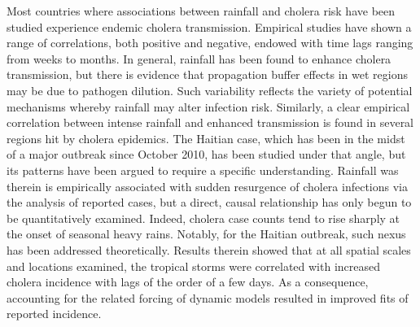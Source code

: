 Most countries where associations between rainfall and cholera risk have been studied experience endemic cholera transmission\cite{Rinaldo:ModelingKeyDrivers:2017}. Empirical studies have shown a range of correlations, both positive and negative, endowed with time lags ranging from weeks to months\cite{Ruiz-Moreno:CholeraSeasonalityMadras:2007,Emch:SeasonalityCholera1974:2008,Magny:CholeraOutbreakSenegal:2012}. In general, rainfall has been found to enhance cholera transmission, but there is evidence that propagation buffer effects in wet regions may be due to pathogen dilution\cite{Ruiz-Moreno:CholeraSeasonalityMadras:2007}. Such variability reflects the variety of potential mechanisms whereby rainfall may alter infection risk. Similarly, a clear empirical correlation between intense rainfall and enhanced transmission is found in several regions hit by cholera epidemics\cite{Magny:EnvironmentalSignaturesAssociated:2008,Rebaudet:EnvironmentalDeterminantsCholera:2013,Rebaudet:CholeraCoastalAfrica:2013,Jutla:WaterMarkerMonitored:2013,Gaudart:SpatioTemporalDynamicsCholera:2013}. The Haitian case, which has been in the midst of a major outbreak since October 2010\cite{Frerichs:NepaleseOriginCholera:2012,Gaudart:SpatioTemporalDynamicsCholera:2013,Kirpich:CholeraTransmissionOuest:2015,ERCCECHO:HaitiHurricaneMatthew:2016,Camacho:PredictionCholeraDynamics:2016,Pasetto:RealtimeProjectionsCholera:2017,Khan:AssessmentRiskCholera:2017}, has been studied under that angle, but its patterns have been argued to require a specific understanding\cite{Piarroux:UnderstandingCholeraEpidemic:2011}. Rainfall was therein is empirically associated with sudden resurgence of cholera infections via the analysis of reported cases\cite{Gaudart:SpatioTemporalDynamicsCholera:2013}, but a direct, causal relationship has only begun to be quantitatively examined\cite{Rinaldo:Reassessment20102011:2012,Eisenberg:ExaminingRainfallCholera:2013,Bertuzzo:ProbabilityExtinctionHaiti:2016}. Indeed, cholera case counts tend to rise sharply at the onset of seasonal heavy rains\cite{Adams:HaitiPreparesCholera:2012,Periago:EliminationCholeraTransmission:2012,Adams:CholeraHaitiTakes:2013}. Notably, for the Haitian outbreak, such nexus has been addressed theoretically\cite{Rinaldo:Reassessment20102011:2012,Eisenberg:ExaminingRainfallCholera:2013}. Results therein showed that at all spatial scales and locations examined, the tropical storms were correlated with increased cholera incidence with lags of the order of a few days. As a consequence, accounting for the related forcing of dynamic models resulted in improved fits of reported incidence. 

